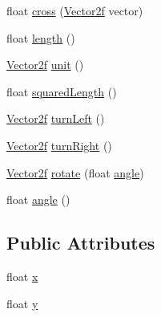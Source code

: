 \begin{DoxyCompactItemize}
\item 
float \hyperlink{class_vector2f_a0dc5b93838aa574e8aa00202ace11b9d}{cross} (\hyperlink{class_vector2f}{Vector2f} vector)
\item 
float \hyperlink{class_vector2f_a747f9f110283fd63d127b16521ee6fdc}{length} ()
\item 
\hyperlink{class_vector2f}{Vector2f} \hyperlink{class_vector2f_a6781e87d4d26cfc5d10a17e25c870f75}{unit} ()
\item 
float \hyperlink{class_vector2f_ac764933194f295f7671f36f32488ffb9}{squared\-Length} ()
\item 
\hyperlink{class_vector2f}{Vector2f} \hyperlink{class_vector2f_a877a04381f86f6157086c7901d460fc7}{turn\-Left} ()
\item 
\hyperlink{class_vector2f}{Vector2f} \hyperlink{class_vector2f_af63c77fc78259eb26ea05113254ee7e3}{turn\-Right} ()
\item 
\hyperlink{class_vector2f}{Vector2f} \hyperlink{class_vector2f_a4b32222b718c1e0e00317b1390fc555b}{rotate} (float \hyperlink{class_vector2f_a2d8be50dd28dc0ba8c1dcf1ecada2a23}{angle})
\item 
float \hyperlink{class_vector2f_a2d8be50dd28dc0ba8c1dcf1ecada2a23}{angle} ()
\end{DoxyCompactItemize}
\subsection*{Public Attributes}
\begin{DoxyCompactItemize}
\item 
float \hyperlink{class_vector2f_add58d2378e3a3abdb76cf0ac51c9acfc}{x}
\item 
float \hyperlink{class_vector2f_a14874a72597fd358b15f8ba34b999c4d}{y}
\end{DoxyCompactItemize}


